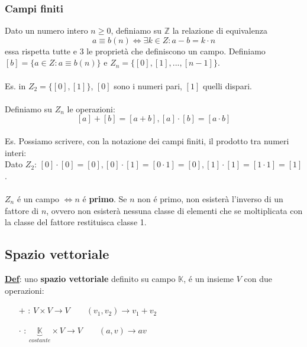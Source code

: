 \documentclass[12pt]{article}
\begin{document}
\subsubsection{Campi finiti}
Dato un numero intero $n \ge 0$, definiamo su $\mathbb{Z}$ la relazione di equivalenza
$$a \equiv b (n) \iff \exists k \in Z : a - b = k \cdot n$$
essa rispetta tutte e 3 le proprietà che definiscono un campo.
Definiamo $[b] = \{a \in Z : a \equiv b (n)\}$ e $Z_n = \{[0], [1], ..., [n-1]\}$.\\\\
Es. in $Z_2 = \{[0], [1]\}$, $[0]$ sono i numeri pari, $[1]$ quelli dispari. \\\\
Definiamo su $Z_n$ le operazioni:\\
$$[a] + [b] = [a+b], [a] \cdot [b] = [a \cdot b]$$ \\
Es. Possiamo scrivere, con la notazione dei campi finiti, il prodotto tra numeri interi: \\
Dato $Z_2$: $[0] \cdot [0] = [0], [0] \cdot [1] = [0 \cdot 1] = [0], [1] \cdot [1] = [1 \cdot 1] = [1]$. \\\\
$Z_n$ é un campo $\iff n$ é \textbf{primo}. Se $n$ non é primo, non esisterà l'inverso di un fattore di $n$, ovvero non esisterà nessuna classe di elementi che se moltiplicata con la classe del fattore restituisca classe 1.

\subsection{Spazio vettoriale}
\textbf{\underline{Def}}: uno \textbf{spazio vettoriale} definito su campo $\mathbb{K}$, é un insieme $V$ con due operazioni:
\begin{enumerate}
    \item[$\boldsymbol{+}$]: $V \times V \longrightarrow V \quad\quad (v_1,v_2) \rightarrow v_1 + v_2$
    \item[$\boldsymbol{\cdot}$]: $\underbrace{\mathbb{K}}_{costante}\times V \longrightarrow V \quad\quad (a,v) \rightarrow av$\\
\end{enumerate}
\end{document}
